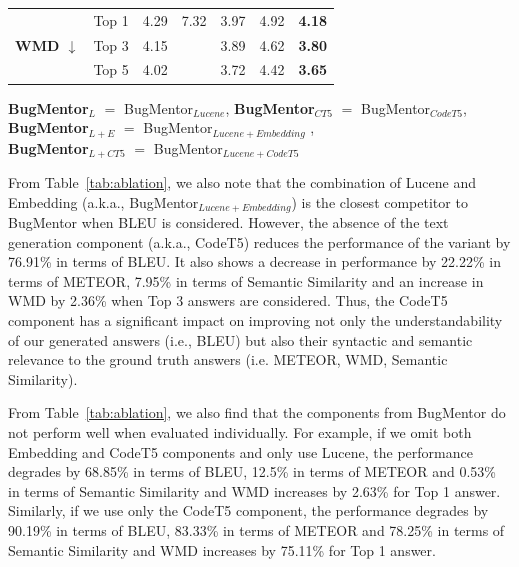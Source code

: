 \begin{table}[!t]
{\begin{tabular}{|c|c|clccc|}
\multirow{3}{*}{\textbf{WMD $\downarrow$}} & Top 1 & \multicolumn{1}{c|}{4.29} & \multicolumn{1}{c|}{7.32} & \multicolumn{1}{c|}{3.97} & \multicolumn{1}{c|}{4.92} & \textbf{4.18} \\ \cline{2-7} 
 & Top 3 & \multicolumn{1}{c|}{4.15} & \multicolumn{1}{l|}{\multirow{2}{*}{}} & \multicolumn{1}{c|}{3.89} & \multicolumn{1}{c|}{4.62} & \textbf{3.80} \\ \cline{2-3} \cline{5-7} 
 & Top 5 & \multicolumn{1}{c|}{4.02} & \multicolumn{1}{l|}{} & \multicolumn{1}{c|}{3.72} & \multicolumn{1}{c|}{4.42} & \textbf{3.65} \\ \hline
\end{tabular}%
}
\begin{tablenotes}
  \small
  \item \begin{center}
     \textbf{BugMentor$_{L}$} $=$ BugMentor$_{Lucene}$, \textbf{BugMentor$_{CT5}$} $=$ BugMentor$_{CodeT5}$,\\
     \textbf{BugMentor$_{L+E}$} $=$ BugMentor$_{Lucene + Embedding}$ ,\\ \textbf{BugMentor$_{L+CT5}$} $=$ BugMentor$_{Lucene+CodeT5}$
  \end{center}
\end{tablenotes}
\end{table}


From Table~\ref{tab:ablation}, we also note that the combination of Lucene and Embedding (a.k.a., BugMentor$_{Lucene + Embedding}$) is the closest competitor to BugMentor when BLEU is considered. However, the absence of the text generation component (a.k.a., CodeT5) reduces the performance of the variant by 76.91\% in terms of BLEU. It also shows a decrease in performance by 22.22\% in terms of METEOR, 7.95\% in terms of Semantic Similarity and an increase in WMD by 2.36\% when Top 3 answers are considered. Thus, the CodeT5 component has a significant impact on improving not only the understandability of our generated answers (i.e., BLEU) but also their syntactic and semantic relevance to the ground truth answers (i.e. METEOR, WMD, Semantic Similarity).\par

From Table~\ref{tab:ablation}, we also find that the components from BugMentor do not perform well when evaluated individually. For example, if we omit both Embedding and CodeT5 components and only use Lucene, the performance degrades by 68.85\% in terms of BLEU, 12.5\% in terms of METEOR and 0.53\% in terms of Semantic Similarity and WMD increases by 2.63\% for Top 1 answer. Similarly, if we use only the CodeT5 component, the performance degrades by 90.19\% in terms of BLEU, 83.33\% in terms of METEOR and 78.25\% in terms of Semantic Similarity and WMD increases by 75.11\% for Top 1 answer. \par


